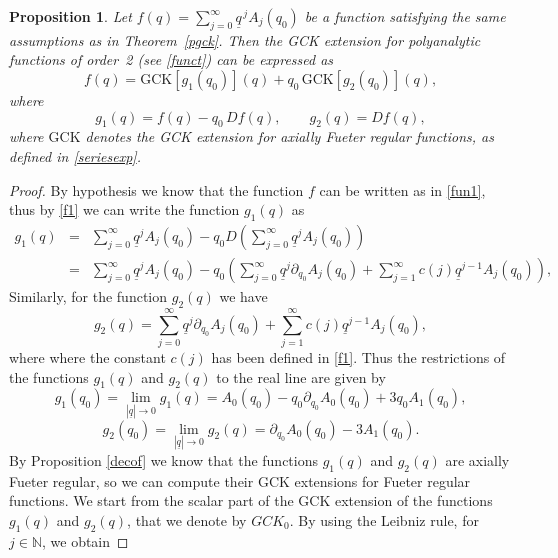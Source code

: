 \documentclass[reqno,11pt]{amsart}
\numberwithin{equation}{section}
\newtheorem{proposition}[theorem]{Proposition}
\theoremstyle{definition}
\begin{document}
\begin{proposition}
\label{decop}
	Let $f(q) = \sum_{j=0}^{\infty} \underline{q}^{\,j} A_j(q_0)$ be a function satisfying the same assumptions as in Theorem~\ref{pgck}. Then the GCK extension for polyanalytic functions of order~2 (see \eqref{funct}) can be expressed as
\begin{equation}
\label{Pgck}
f(q) = \mathrm{GCK}[g_1(q_0)](q) + q_0\, \mathrm{GCK}[g_2(q_0)](q),
\end{equation}
where
$$
g_1(q) = f(q) - q_0\, Df(q), \qquad g_2(q) = Df(q),
$$
where $\mathrm{GCK}$ denotes the GCK extension for axially Fueter regular functions, as defined in \eqref{seriesexp}.
\end{proposition}
\begin{proof}
By hypothesis we know that the function $f$ can be written as in \eqref{fun1}, thus by \eqref{f1} we can write the function $g_1(q)$ as
\begin{eqnarray*}
g_1(q)&=& \sum_{j=0}^\infty \underline{q}^j A_j(q_0)- q_0 D \left(\sum_{j=0}^\infty  \underline{q}^j A_j(q_0)\right)\\
&=&\sum_{j=0}^\infty \underline{q}^j A_j(q_0)- q_0 \left( \sum_{j=0}^\infty \underline{q}^j \partial_{q_0} A_j(q_0)+ \sum_{j=1}^\infty c(j) \underline{q}^{j-1} A_j(q_0)\right),
\end{eqnarray*}
Similarly, for the function $g_2(q)$ we have
$$ g_2(q)=\sum_{j=0}^\infty \underline{q}^j \partial_{q_0} A_j(q_0)+ \sum_{j=1}^\infty c(j) \underline{q}^{j-1} A_j(q_0),$$
where where the constant $c(j)$ has been defined in \eqref{f1}.
Thus the restrictions of the functions $g_1(q)$ and $g_2(q)$ to the real line are given by
\begin{equation}
\label{res1}
g_1(q_0)= \lim_{|\underline{q}| \to 0}g_1(q) =A_0(q_0)-q_0 \partial_{q_0} A_0(q_0)+3q_0 A_1(q_0),
\end{equation}
\begin{equation}
\label{res2}
g_2(q_0)=\lim_{|\underline{q}| \to 0} g_2(q)=\partial_{q_0} A_0(q_0)-3A_1(q_0).
\end{equation}
By Proposition \ref{decof} we know that the functions $g_1(q)$ and $g_2(q)$ are axially Fueter regular, so we can compute their GCK extensions for Fueter regular functions. We start from the scalar part of the GCK extension of the functions $g_1(q)$ and $g_2(q)$, that we denote by $GCK_0$. By using the Leibniz rule, for $j \in \mathbb{N}$, we obtain


\end{proof}
\end{document}
